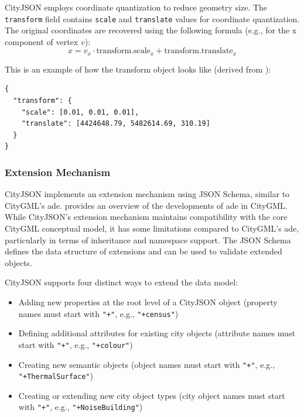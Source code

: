 CityJSON employs coordinate quantization to reduce geometry size. The \texttt{transform} field contains \texttt{scale} and \texttt{translate} values for coordinate quantization. The original coordinates are recovered using the following formula (e.g., for the x component of vertex $v$):
\begin{equation}
  \label{eq:cityjson:coordinate_quantisation}
  x = v_x \cdot \text{transform.scale}_x + \text{transform.translate}_x
\end{equation}

This is an example of how the transform object looks like (derived from \citet{ledoux_2019}):
\begin{lstlisting}
{
  "transform": {
    "scale": [0.01, 0.01, 0.01],
    "translate": [4424648.79, 5482614.69, 310.19]
  }
}
\end{lstlisting}

\subsubsection{Extension Mechanism}
\label{rw:cityjson:extension_mechanism}

CityJSON implements an extension mechanism using JSON Schema, similar to CityGML's \ac{ade}.
\citet{fillip_2018} provides an overview of the developments of \ac{ade} in CityGML. While CityJSON's extension mechanism maintains compatibility with the core CityGML conceptual model, it has some limitations compared to CityGML's \ac{ade}, particularly in terms of inheritance and namespace support.
The JSON Schema defines the data structure of extensions and can be used to validate extended objects.

CityJSON supports four distinct ways to extend the data model:

\begin{itemize}
  \item Adding new properties at the root level of a CityJSON object (property names must start with \texttt{"+"}, e.g., \texttt{"+census"})
  \item Defining additional attributes for existing city objects (attribute names must start with \texttt{"+"}, e.g., \texttt{"+colour"})
  \item Creating new semantic objects (object names must start with \texttt{"+"}, e.g., \texttt{"+ThermalSurface"})
  \item Creating or extending new city object types (city object names must start with \texttt{"+"}, e.g., \texttt{"+NoiseBuilding"})
\end{itemize}

